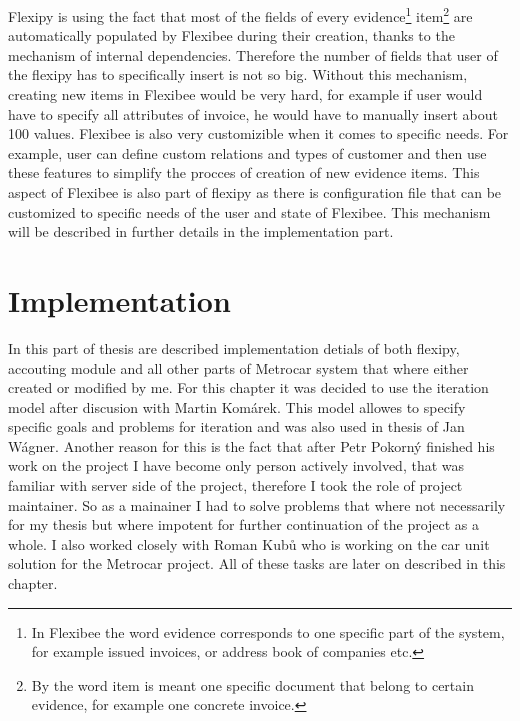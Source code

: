 \documentclass[11pt,twoside,a4paper]{book}
\begin{document}
Flexipy is using the fact that most of the fields of every evidence\footnote{In Flexibee the word evidence corresponds to one specific part of the system, for example issued invoices, or address book of companies etc.} item\footnote{By the word item is meant one specific document that belong to certain evidence, for example one concrete invoice.} are automatically populated by Flexibee during their creation, thanks to the mechanism of internal dependencies\cite{flexDep}. Therefore the number of fields that user of the flexipy has to specifically insert is not so big. Without this mechanism, creating new items in Flexibee would be very hard, for example if user would have to specify all attributes of invoice, he would have to manually insert about 100 values. Flexibee is also very customizible when it comes to specific needs. For example, user can define custom relations and types of customer and then use these features to simplify the procces of creation of new evidence items. This aspect of Flexibee is also part of flexipy as there is configuration file that can be customized to specific needs of the user and state of Flexibee. This mechanism will be described in further details in the implementation part. 



\chapter{Implementation}
In this part of thesis are described implementation detials of both flexipy, accouting module and all other parts of Metrocar system that where either created or modified by me. For this chapter it was decided to use the iteration model after discusion with Martin Komárek. This model allowes to specify specific goals and problems for iteration and was also used in thesis of Jan Wágner. Another reason for this is the fact that after Petr Pokorný finished his work on the project I have become only person actively involved, that was familiar with server side of the project, therefore I took the role of project maintainer. So as a mainainer I had to solve problems that where not necessarily for my thesis but where impotent for further continuation of the project as a whole. I also worked closely with Roman Kubů who is working on the car unit solution for the Metrocar project. All of these tasks are later on described in this chapter.
\end{document}
